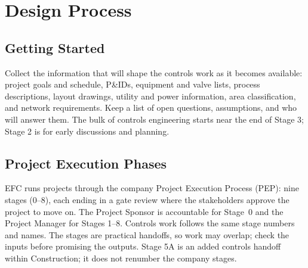 \chapter{Design Process}\label{ch:design-process}

\section{Getting Started}\label{ch:getting-started}
Collect the information that will shape the controls work as it becomes available: project goals and schedule, P\&IDs, equipment and valve lists, process descriptions, layout drawings, utility and power information, area classification, and network requirements. Keep a list of open questions, assumptions, and who will answer them. The bulk of controls engineering starts near the end of Stage 3; Stage 2 is for early discussions and planning.

\section{Project Execution Phases}\label{sec:pep}
EFC runs projects through the company Project Execution Process (PEP): nine stages (0--8), each ending in a gate review where the stakeholders approve the project to move on. The Project Sponsor is accountable for Stage~0 and the Project Manager for Stages 1--8. Controls work follows the same stage numbers and names. The stages are practical handoffs, so work may overlap; check the inputs before promising the outputs. Stage 5A is an added controls handoff within Construction; it does not renumber the company stages.


